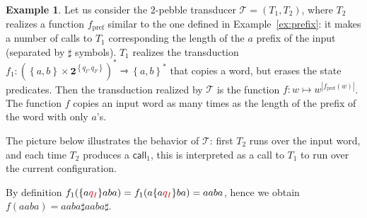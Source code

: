 \documentclass{article}
\newcommand{\set}[1]{\left\{#1 \right\}}
\newcommand{\tuple}[1]{\left(#1 \right)}
\newcommand{\mright}{\rightarrowtriangle}
\newcommand{\Tt}{\mathcal T}
\newcommand{\call}{\mathsf {call}}
\theoremstyle{definition}
\newtheorem{example}[theorem]{Example}
\theoremstyle{remark}
\begin{document}
\begin{example}
Let us consider the $2$-pebble transducer $\Tt=\tuple{T_1,T_2}$, where $T_2$ realizes a function $f_{\mathrm{pref}}$ similar to the one defined in Example~\ref{ex:prefix}: it makes a number of calls to $T_1$ corresponding the length of the $a$ prefix of the input (separated by $\sharp$ symbols). $T_1$ realizes the transduction $f_{1}:(\set{a,b}\times \mathbf 2 ^{\set{q_I,q_F}})^*\mright \set{a,b}^*$ that copies a word, but erases the state predicates.
Then the transduction realized by $\Tt$ is the function $f:w\mapsto w^{|f_{\mathrm{pref}}(w)|}$.
The function $f$ copies an input word as many times as the length of the prefix of the word with only $a$'s.

The picture below illustrates the behavior of $\Tt$: first $T_2$ runs over the input word, and each time $T_2$ produces a $\call_1$, this is interpreted as a call to $T_1$ to run over the current configuration. 

\begin{center}


\end{center}
By definition $f_1(  \{a{\color{red!80!black}q_I}\}aba)=f_1(  a\{a{\color{red!80!black}q_I}\}ba)=aaba$, hence we obtain $f(aaba)= aaba\sharp aaba\sharp$.
\end{example}
  
\end{document}
